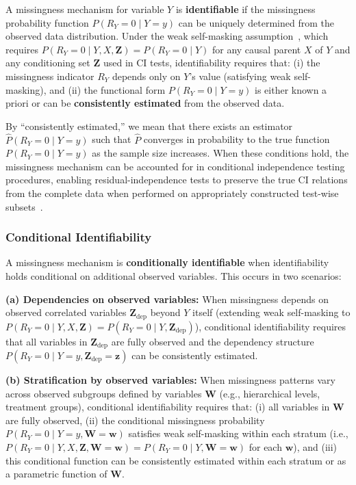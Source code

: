 \documentclass[runningheads]{llncs}
\begin{document}
\begin{definition}
A missingness mechanism for variable $Y$ is \textbf{identifiable} if the missingness probability function $P(R_Y = 0 \mid Y = y)$ can be uniquely determined from the observed data distribution. Under the weak self-masking assumption~\cite{qiao2024identification}, which requires $P(R_Y = 0 \mid Y, X, \mathbf{Z}) = P(R_Y = 0 \mid Y)$ for any causal parent $X$ of $Y$ and any conditioning set $\mathbf{Z}$ used in CI tests, identifiability requires that: (i) the missingness indicator $R_Y$ depends only on $Y$'s value (satisfying weak self-masking), and (ii) the functional form $P(R_Y = 0 \mid Y = y)$ is either known a priori or can be \textbf{consistently estimated} from the observed data.
\end{definition}

By ``consistently estimated,'' we mean that there exists an estimator $\hat{P}(R_Y = 0 \mid Y = y)$ such that $\hat{P}$ converges in probability to the true function $P(R_Y = 0 \mid Y = y)$ as the sample size increases. When these conditions hold, the missingness mechanism can be accounted for in conditional independence testing procedures, enabling residual-independence tests to preserve the true CI relations from the complete data when performed on appropriately constructed test-wise subsets~\cite{qiao2024identification}.

\subsubsection{Conditional Identifiability}

A missingness mechanism is \textbf{conditionally identifiable} when identifiability holds conditional on additional observed variables. This occurs in two scenarios:

\vspace{0.1cm}
\textbf{(a) Dependencies on observed variables:} When missingness depends on observed correlated variables $\mathbf{Z}_{\text{dep}}$ beyond $Y$ itself (extending weak self-masking to $P(R_Y = 0 \mid Y, X, \mathbf{Z}) = P(R_Y = 0 \mid Y, \mathbf{Z}_{\text{dep}})$), conditional identifiability requires that all variables in $\mathbf{Z}_{\text{dep}}$ are fully observed and the dependency structure $P(R_Y = 0 \mid Y = y, \mathbf{Z}_{\text{dep}} = \mathbf{z})$ can be consistently estimated. 
\vspace{0.1cm}

\textbf{(b) Stratification by observed variables:} When missingness patterns vary across observed subgroups defined by variables $\mathbf{W}$ (e.g., hierarchical levels, treatment groups), conditional identifiability requires that: (i) all variables in $\mathbf{W}$ are fully observed, (ii) the conditional missingness probability $P(R_Y = 0 \mid Y = y, \mathbf{W} = \mathbf{w})$ satisfies weak self-masking within each stratum (i.e., $P(R_Y = 0 \mid Y, X, \mathbf{Z}, \mathbf{W} = \mathbf{w}) = P(R_Y = 0 \mid Y, \mathbf{W} = \mathbf{w})$ for each $\mathbf{w}$), and (iii) this conditional function can be consistently estimated within each stratum or as a parametric function of $\mathbf{W}$. 
\end{document}
